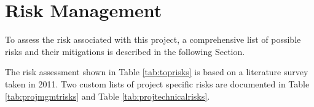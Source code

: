 \section{Risk Management}


To assess the risk associated with this project, a comprehensive list of possible risks and their mitigations is described in the following Section. 

The risk assessment shown in Table \ref{tab:toprisks} is based on a literature survey\cite{risk} taken in 2011. Two custom lists of project specific risks are documented in Table \ref{tab:projmgmtrisks} and Table \ref{tab:projtechnicalrisks}.


